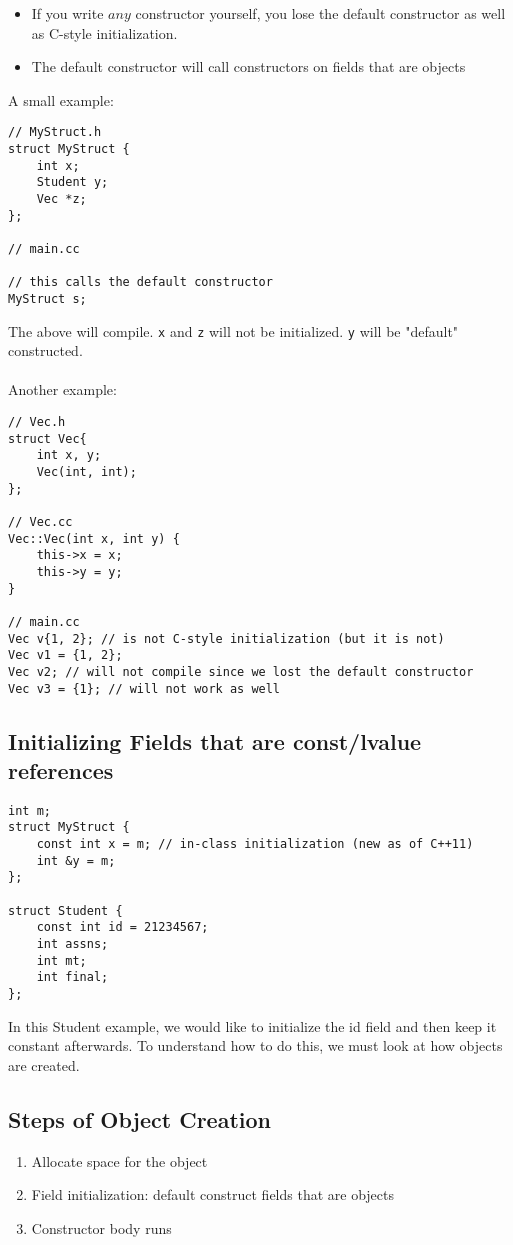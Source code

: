 \documentclass[12pt]{article}
\begin{document}
\begin{itemize}
    \item If you write $any$ constructor yourself, you lose the default constructor as well as C-style initialization.
    \item The default constructor will call constructors on fields that are objects
\end{itemize}
A small example:
\begin{lstlisting}
// MyStruct.h
struct MyStruct {
    int x;
    Student y;
    Vec *z;
};

// main.cc

// this calls the default constructor
MyStruct s;
\end{lstlisting}
The above will compile. \lstinline{x} and \lstinline{z} will not be initialized. \lstinline{y} will be "default" constructed.\\\\

Another example:
\begin{lstlisting}
// Vec.h
struct Vec{
    int x, y;
    Vec(int, int);
};

// Vec.cc
Vec::Vec(int x, int y) {
    this->x = x;
    this->y = y;
}

// main.cc
Vec v{1, 2}; // is not C-style initialization (but it is not)
Vec v1 = {1, 2};
Vec v2; // will not compile since we lost the default constructor
Vec v3 = {1}; // will not work as well
\end{lstlisting}

\subsection{Initializing Fields that are const/lvalue references}
\begin{lstlisting}
int m;
struct MyStruct {
    const int x = m; // in-class initialization (new as of C++11)
    int &y = m;
};

struct Student {
    const int id = 21234567;
    int assns;
    int mt;
    int final;
};
\end{lstlisting}

In this Student example, we would like to initialize the id field and then keep it constant afterwards. To understand how to do this, we must look at how objects are created.

\subsection{Steps of Object Creation}
\begin{enumerate}
    \item Allocate space for the object
    \item Field initialization: default construct fields that are objects
    \item Constructor body runs
\end{enumerate}
\end{document}
